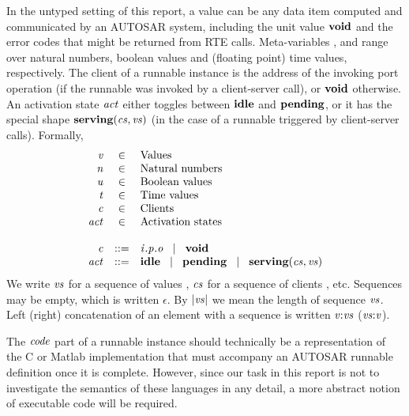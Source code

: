 \documentclass[twocolumn]{article}
\begin{document}
In the untyped setting of this report, a value  can be any data item computed and communicated by an AUTOSAR system, including the unit value $\textbf{void}$ and the error codes that might be returned from RTE calls. Meta-variables ,  and  range over natural numbers, boolean values and (floating point) time values, respectively. The client  of a runnable instance is the address of the invoking port operation (if the runnable was invoked by a client-server call), or $\textbf{void}$ otherwise. An activation state $\Act$ either toggles between $\textbf{idle}$ and $\textbf{pending}$, or it has the special shape $\Tserving{\Cs}{\Vs}$ (in the case of a runnable triggered by client-server calls). Formally,
\[
\begin{array}{rcll}
  \V{V}    & \in & \text{Values} \\
  \V{N}    & \in & \text{Natural numbers} \\
  \V{U}    & \in & \text{Boolean values} \\
  \V{T}    & \in & \text{Time values} \\
  \V{C}    & \in & \text{Clients} \\
  \Act     & \in & \text{Activation states} \\ \\
  \V{C}    & ::= & \Top{\V{O}}{\V{P}}{\V{I}} \sep \Tvoid \\
  \Act     & ::= & \Tidle \sep \Tpending \sep \Tserving{\Cs}{\Vs} \\
\end{array}
\]
We write $\Vs$ for a sequence of values , $\Cs$ for a sequence of clients , etc. Sequences may be empty, which is written $\epsilon$. By $\Tlength{\Vs}$ we mean the length of sequence $\Vs$. Left (right) concatenation of an element with a sequence is written $\Tcons{\V{V}}{\V{Vs}}$ ($\Tsnoc{\V{Vs}}{\V{V}}$).

The $\Code$ part of a runnable instance should technically be a representation of the C or Matlab implementation that must accompany an AUTOSAR runnable definition once it is complete. However, since our task in this report is not to investigate the semantics of these languages in any detail, a more abstract notion of executable code will be required.
\end{document}

